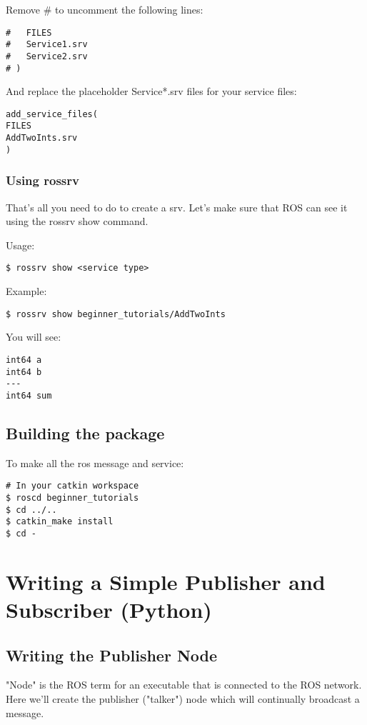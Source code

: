 Remove \# to uncomment the following lines:
\begin{lstlisting}[breaklines=true languages=bash]
#   FILES
#   Service1.srv
#   Service2.srv
# )
\end{lstlisting}

And replace the placeholder Service*.srv files for your service files:
\begin{lstlisting}[breaklines=true languages=bash]
add_service_files(
FILES
AddTwoInts.srv
)
\end{lstlisting}

\subsubsection{Using rossrv}
That's all you need to do to create a srv. Let's make sure that ROS can see it using the rossrv show command.

Usage:
\begin{lstlisting}[breaklines=true languages=bash]
$ rossrv show <service type>
\end{lstlisting}

Example:

\begin{lstlisting}[breaklines=true languages=bash]
$ rossrv show beginner_tutorials/AddTwoInts
\end{lstlisting}

You will see:
\begin{lstlisting}[breaklines=true languages=bash]
int64 a
int64 b
---
int64 sum
\end{lstlisting}

\subsection{Building the package}

To make all the ros message and service:
\begin{lstlisting}[breaklines=true languages=bash]
# In your catkin workspace
$ roscd beginner_tutorials
$ cd ../..
$ catkin_make install
$ cd -
\end{lstlisting}

\section{Writing a Simple Publisher and Subscriber (Python)}

\subsection{Writing the Publisher Node}
"Node" is the ROS term for an executable that is connected to the ROS network. Here we'll create the publisher ("talker") node which will continually broadcast a message.

